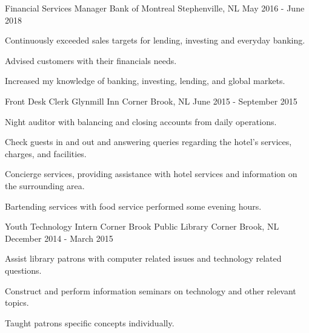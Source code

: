 

\begin{cventries}

  \cventry
    {Financial Services Manager} %
    {Bank of Montreal} %
    {Stephenville, NL} %
    {May 2016 - June 2018} %
    {
      \begin{cvitems} %
        \item {Continuously exceeded sales targets for lending, investing and everyday banking.}
        \item {Advised customers with their financials needs.}
        \item {Increased my knowledge of banking, investing, lending, and global markets.}
      \end{cvitems}
    }

  \cventry
    {Front Desk Clerk} %
    {Glynmill Inn} %
    {Corner Brook, NL} %
    {June 2015 - September 2015} %
    {
      \begin{cvitems} %
        \item {Night auditor with balancing and closing accounts from daily operations.}
        \item {Check guests in and out and answering queries regarding the hotel's services, charges, and facilities.}
        \item {Concierge services, providing assistance with hotel services and information on the surrounding area.}
		\item {Bartending services with food service performed some evening hours.}
      \end{cvitems}
    }

  \cventry
    {Youth Technology Intern} %
    {Corner Brook Public Library} %
    {Corner Brook, NL} %
    {December 2014 - March 2015} %
    {
      \begin{cvitems} %
        \item {Assist library patrons with computer related issues and technology related questions.}
        \item {Construct and perform information seminars on technology and other relevant topics.}
        \item {Taught patrons specific concepts individually.}
      \end{cvitems}
    }


\end{cventries}
